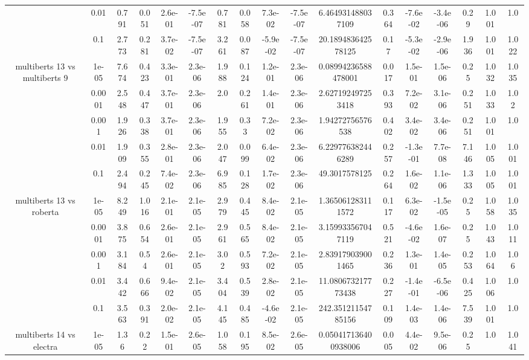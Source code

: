 \begin{tabular}{|c|c|c|c|c|c|c|c|c|c|c|c|c|c|c|c|c|}
 & 0.01 & 0.791 & 0.051 & 2.6e-01 & -7.5e-07 & 0.781 & 0.058 & 7.3e-02 & -7.5e-07 & 6.464931488037109 & 0.364 & -7.6e-02 & -3.4e-06 & 0.29 & 1.001 & 1.0 \\
 & 0.1 & 2.773 & 0.281 & 3.7e-02 & -7.5e-07 & 3.261 & 0.087 & -5.9e-02 & -7.5e-07 & 20.189483642578125 & 0.17 & -5.3e-02 & -2.9e-06 & 1.936 & 1.001 & 1.022 \\
\hline
\multirow{5}{*}{multiberts 13 vs multiberts 9} & 1e-05 & 7.674 & 0.423 & 3.3e-01 & 2.3e-06 & 1.988 & 0.124 & 1.2e-01 & 2.3e-06 & 0.08994236588478001 & 0.017 & 1.5e-01 & 1.5e-06 & 0.25 & 1.032 & 1.035 \\
 & 0.0001 & 2.548 & 0.447 & 3.7e-01 & 2.3e-06 & 2.0 & 0.261 & 1.4e-01 & 2.3e-06 & 2.627192497253418 & 0.393 & 7.2e-02 & 3.1e-06 & 0.251 & 1.033 & 1.02 \\
 & 0.001 & 1.926 & 0.338 & 3.7e-01 & 2.3e-06 & 1.955 & 0.33 & 7.2e-02 & 2.3e-06 & 1.94272756576538 & 0.402 & 3.4e-02 & 3.4e-06 & 0.251 & 1.001 & 1.0 \\
 & 0.01 & 1.909 & 0.355 & 2.8e-01 & 2.3e-06 & 2.047 & 0.099 & 6.4e-02 & 2.3e-06 & 6.229776382446289 & 0.257 & -1.3e-01 & 7.7e-08 & 7.146 & 1.005 & 1.001 \\
 & 0.1 & 2.494 & 0.245 & 7.4e-02 & 2.3e-06 & 6.985 & 0.128 & 1.7e-02 & 2.3e-06 & 49.3017578125 & 0.264 & 1.6e-02 & 1.1e-06 & 1.333 & 1.005 & 1.001 \\
\hline
\multirow{5}{*}{multiberts 13 vs roberta } & 1e-05 & 8.249 & 1.016 & 2.1e-01 & 2.1e-05 & 2.979 & 0.445 & 8.4e-02 & 2.1e-05 & 1.365061283111572 & 0.117 & 6.3e-02 & -1.5e-05 & 0.25 & 1.058 & 1.035 \\
 & 0.0001 & 3.875 & 0.654 & 2.6e-01 & 2.1e-05 & 2.961 & 0.565 & 8.4e-02 & 2.1e-05 & 3.159933567047119 & 0.521 & -4.6e-02 & 1.6e-07 & 0.25 & 1.043 & 1.011 \\
 & 0.001 & 3.184 & 0.54 & 2.6e-01 & 2.1e-05 & 3.02 & 0.593 & 7.2e-02 & 2.1e-05 & 2.839179039001465 & 0.236 & 1.3e-01 & 1.4e-05 & 0.253 & 1.064 & 1.06 \\
 & 0.01 & 3.442 & 0.666 & 9.4e-02 & 2.1e-05 & 3.404 & 0.539 & 2.8e-02 & 2.1e-05 & 11.080673217773438 & 0.227 & -1.4e-01 & -6.5e-06 & 0.425 & 1.006 & 1.0 \\
 & 0.1 & 3.563 & 0.391 & 2.0e-02 & 2.1e-05 & 4.145 & 0.485 & -4.6e-02 & 2.1e-05 & 242.35121154785156 & 0.109 & 1.4e-03 & 1.4e-06 & 7.539 & 1.001 & 1.0 \\
\hline
\multirow{5}{*}{multiberts 14 vs electra } & 1e-05 & 1.36 & 0.22 & 1.5e-01 & 2.6e-05 & 1.058 & 0.195 & 8.5e-02 & 2.6e-05 & 0.050417136400938006 & 0.005 & 4.4e-02 & 9.5e-06 & 0.25 & 1.0 & 1.041 \\

\end{tabular}
